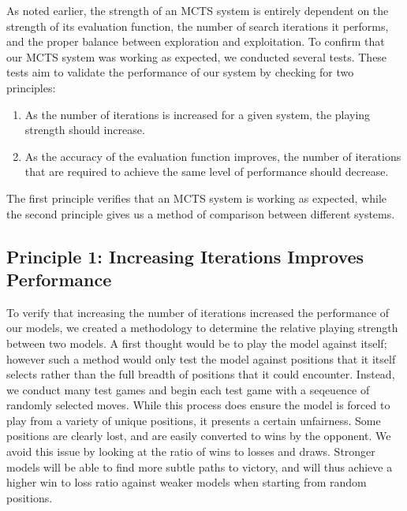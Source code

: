 \documentclass[10pt]{article}
\begin{document}
As noted earlier, the strength of an MCTS system is entirely dependent on the strength of its evaluation function, the number of search iterations it performs, and the proper balance between exploration and exploitation. To confirm that our MCTS system was working as expected, we conducted several tests. These tests aim to validate the performance of our system by checking for two principles:

\begin{enumerate}
    \item As the number of iterations is increased for a given system, the playing strength should increase.
    \item As the accuracy of the evaluation function improves, the number of iterations that are required to achieve the same level of performance should decrease.
\end{enumerate}

The first principle verifies that an MCTS system is working as expected, while the second principle gives us a method of comparison between different systems.

\subsection{Principle 1: Increasing Iterations Improves Performance}
\label{sec:moreitersisbetter}

To verify that increasing the number of iterations increased the performance of our models, we created a methodology to determine the relative playing strength between two models. A first thought would be to play the model against itself; however such a method would only test the model against positions that it itself selects rather than the full breadth of positions that it could encounter. Instead, we conduct many test games and begin each test game with a seqeuence of randomly selected moves. While this process does ensure the model is forced to play from a variety of unique positions, it presents a certain unfairness. Some positions are clearly lost, and are easily converted to wins by the opponent. We avoid this issue by looking at the ratio of wins to losses and draws. Stronger models will be able to find more subtle paths to victory, and will thus achieve a higher win to loss ratio against weaker models when starting from random positions.
\end{document}
